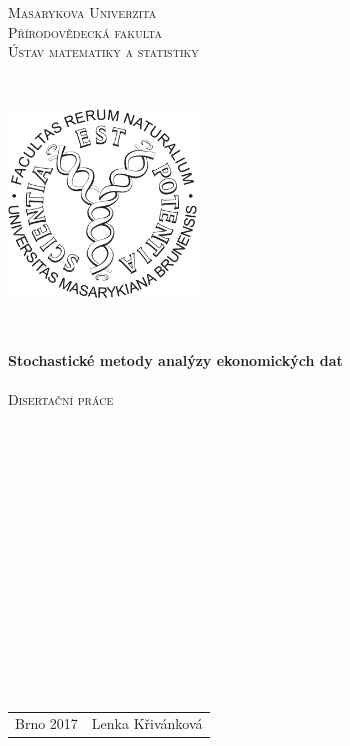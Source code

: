 \documentclass[a4paper,12pt]{report}
\theoremstyle{definition} \newtheorem{definice}[veta]{Definice}
\theoremstyle{remark}
\begin{document}
\titlepage
\begin{center}
\textsc{\Large{Masarykova Univerzita}} \\
\textsc{\Large{Přírodovědecká fakulta}} \\
\textsc{\large{Ústav matematiky a statistiky}}
\end{center}\quad \\
%
\begin{center}
\includegraphics[width=5cm]{IMG/sci-logo.pdf}
\end{center}\quad \\
%
\begin{center}
\textbf{\Large{Stochastické metody analýzy ekonomických dat}} \\ \quad \\
\textsc{\large{Disertační práce}}
\end{center} \quad \\\\\\\\\\\\\\\\\\\\\\\\\\ \\
\begin{center}
\large{
\begin{tabular}{l  r}
\Large{Brno 2017} \qquad\qquad\qquad\qquad \qquad\qquad & \Large{Lenka Křivánková}
\end{tabular}
}
\end{center} \quad
%
\end{document}
